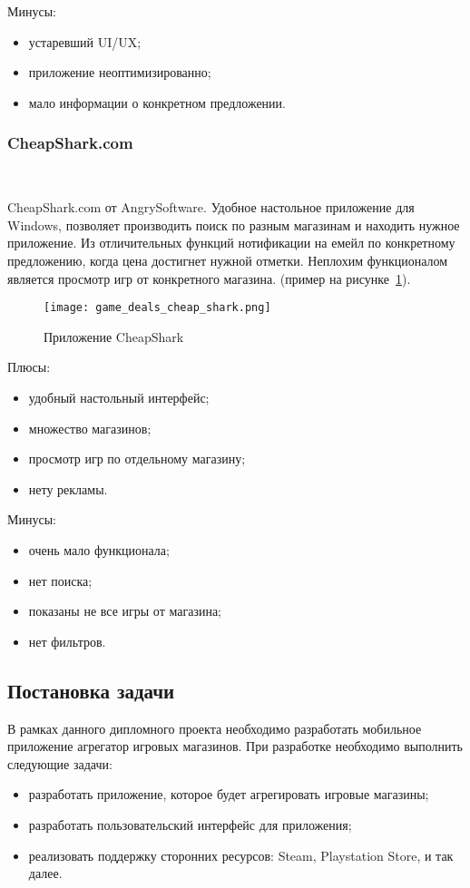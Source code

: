 Минусы:
\begin{itemize}
 \item устаревший UI/UX;
 \item приложение неоптимизированно;
 \item мало информации о конкретном предложении.
\end{itemize}

\subsubsection{CheapShark.com}~\par
CheapShark.com от AngrySoftware. Удобное настольное приложение для Windows, позволяет производить поиск по разным магазинам и находить нужное приложение. Из отличительных функций нотификации на емейл по конкретному предложению, когда цена достигнет нужной отметки. Неплохим функционалом является просмотр игр от конкретного магазина. (пример на рисунке~\ref{fig:domain:game_cheap_shark}).

\begin{figure}[H]
  \centering
    \texttt{[image: game\_deals\_cheap\_shark.png]} 
    \caption{Приложение CheapShark}
    \label{fig:domain:game_cheap_shark}
 \end{figure}

Плюсы:
\begin{itemize}
  \item удобный настольный интерфейс;
  \item множество магазинов;
  \item просмотр игр по отдельному магазину;
  \item нету рекламы.
\end{itemize}

 Минусы:
 \begin{itemize}
  \item очень мало функционала;
  \item нет поиска;
  \item показаны не все игры от магазина;
  \item нет фильтров.
\end{itemize}
 
\subsection{Постановка задачи}
В рамках данного дипломного проекта необходимо разработать мобильное приложение агрегатор игровых магазинов. При разработке необходимо выполнить следующие задачи:
\begin{itemize}
 \item разработать приложение, которое будет агрегировать игровые магазины;
 \item разработать пользовательский интерфейс для приложения;
 \item реализовать поддержку сторонних ресурсов: Steam, Playstation Store, и так далее.
\end{itemize}
 
